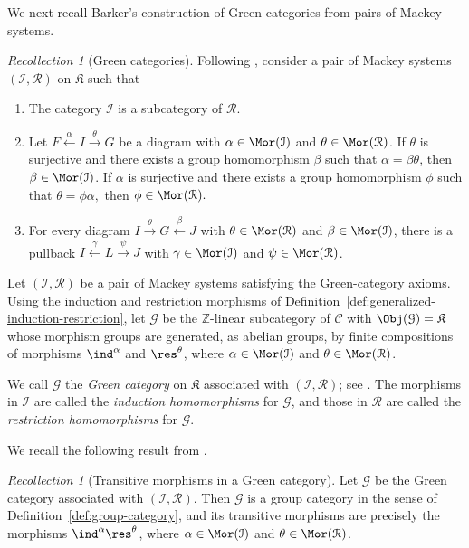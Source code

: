 \documentclass{amsart}
\numberwithin{equation}{section}%
\theoremstyle{remark}
\newtheorem{Rec}[equation]{Recollection}
\theoremstyle{definition}
\begin{document}
%
We next recall Barker's construction of Green categories from pairs
of Mackey systems.
%
\begin{Rec}[Green categories]
\label{rec:green-categories}
Following \cite[Sec.~2]{Barker16b}, consider a pair of Mackey systems
$(\mathcal I,\mathcal R)$ on $\mathfrak K$ such that
%
\begin{enumerate}[\rm({GC}\,1)]
\item 
\label{it:GC-1}%
The category $\mathcal{I}$ is a subcategory of $\mathcal{R}.$
%
\item 
\label{it:GC-2}%
Let $F \stackrel{\alpha}\leftarrow I \stackrel{\theta}\rightarrow G $
be a diagram with $\alpha \in \Mor(\mathcal{I})$ and $\theta \in\Mor(\mathcal{R})$.
If $\theta$ is surjective and there exists a group homomorphism $\beta$ such 
that $\alpha= \beta\theta$, then $\beta \in\Mor(\mathcal{I})$. If $\alpha$ 
is surjective and there exists a group homomorphism $\phi$ such that 
$\theta= \phi\alpha,$ then $\phi \in\Mor(\mathcal{R}).$
%
\item 
\label{it:GC-3}%
For every diagram
$I \stackrel{\theta} \rightarrow  G \stackrel{\beta} \leftarrow J $
with $\theta \in \Mor(\mathcal{R})$
and $\beta \in \Mor(\mathcal{I})$, there is a pullback  
$I \stackrel{\gamma}\leftarrow L \stackrel{\psi}\rightarrow J $ with $\gamma \in
\Mor(\mathcal{I})$ and $\psi \in\Mor(\mathcal{R})$.
\end{enumerate}

Let $(\mathcal I,\mathcal R)$ be a pair of Mackey systems satisfying 
the Green-category axioms. Using the induction and restriction morphisms 
of Definition~\ref{def:generalized-induction-restriction}, let $\mathcal G$ 
be the $\mathbb Z$-linear subcategory of $\mathcal C$ with 
$\Obj(\mathcal G)=\mathfrak K$ whose morphism groups are generated, as 
abelian groups, by finite compositions of morphisms $\ind^\alpha$ and $\res^\theta$, 
where $\alpha\in\Mor(\mathcal I)$ and $\theta\in\Mor(\mathcal R)$.

We call $\mathcal G$ the \emph{Green category} on $\mathfrak K$ associated with 
$(\mathcal I,\mathcal R)$; see \cite[Sec.~2]{Barker16b}. The morphisms in 
$\mathcal I$ are called the \emph{induction homomorphisms} for $\mathcal G$, and 
those in $\mathcal R$ are called the \emph{restriction homomorphisms} for $\mathcal G$.
\end{Rec}
%
We recall the following result from
\cite[Prop.~2.4]{Barker16b}.
%
\begin{Rec}[Transitive morphisms in a Green category]
\label{rec:green-category-transitive-morphisms}
Let $\mathcal G$ be the Green category associated with
$(\mathcal I,\mathcal R)$. Then $\mathcal G$ is a group category
in the sense of Definition~\ref{def:group-category}, and its
transitive morphisms are precisely the morphisms
$\ind^\alpha\res^\theta$,
where $\alpha\in\Mor(\mathcal I)$ and
$\theta\in\Mor(\mathcal R)$.
\end{Rec}
\end{document}

